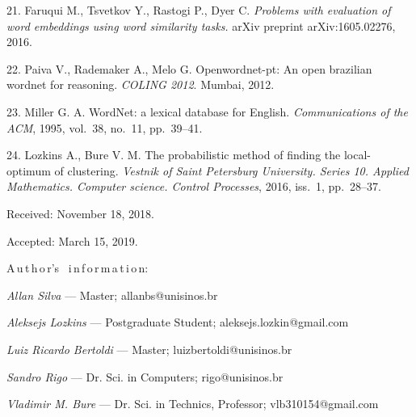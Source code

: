 {21. Faruqui M., Tsvetkov Y., Rastogi P., Dyer C. {\it Problems
with evaluation of word embeddings using word similarity tasks.}
arXiv preprint arXiv:1605.02276, 2016.

22. Paiva V., Rademaker A., Melo G. Openwordnet-pt: An open
brazilian wordnet for reasoning. {\it COLING 2012}. Mumbai, 2012.

23. Miller G. A. WordNet: a lexical database for English. {\it
Communications of the ACM}, 1995, vol.~38, no.~11, pp.~39--41.

24.  Lozkins A., Bure V. M. The probabilistic method of finding
the local-optimum of clustering. {\it Vestnik of Saint Petersburg
University. Series 10. Applied Mathematics. Computer science.
Control Processes}, 2016, iss.~1, pp.~28--37.


\vskip 1.5mm

%

Received:  November 18, 2018.

Accepted: March 15, 2019.

\vskip4.5mm%
A\,u\,t\,h\,o\,r's \ i\,n\,f\,o\,r\,m\,a\,t\,i\,o\,n:

\vskip2mm\textit{Allan Silva} --- Master; allanbs@unisinos.br

\vskip2mm\textit{Aleksejs Lozkins} --- Postgraduate Student;
aleksejs.lozkin@gmail.com

\vskip2mm\textit{Luiz Ricardo Bertoldi} --- Master;
luizbertoldi@unisinos.br

\vskip2mm\textit{Sandro Rigo} --- Dr. Sci. in Computers;
rigo@unisinos.br

\vskip2mm\textit{Vladimir M. Bure} --- Dr. Sci. in Technics,
Professor; vlb310154@gmail.com

}
